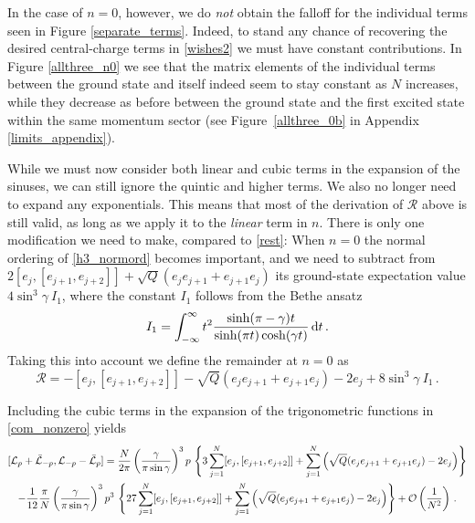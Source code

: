 \documentclass[a4paper,10pt]{article}
\newcommand{\hubert}[1]{$\framebox{\tiny h}$\ \textbf{\texttt{{\color{blue}\footnotesize#1}}}}
\newcommand{\KSgen}{\mathcal{L}}
\newcommand{\remainder}{\mathcal{R}}
\begin{document}
In the case of $n=0$, however, we do \emph{not} obtain the falloff for the individual terms seen in Figure \ref{separate_terms}. Indeed, to stand any chance of recovering the desired central-charge terms in \eqref{wishes2} we must have constant contributions. In Figure \ref{allthree_n0} we see that the matrix elements of the individual terms between the ground state and itself indeed seem to stay constant as $N$ increases, while they decrease as before between the ground state and the first excited state within the same momentum sector (see Figure~\ref{allthree_0b} in Appendix \ref{limits_appendix}).

While we must now consider both linear and cubic terms in the expansion of the sinuses, we can still ignore the quintic and higher terms. We also no longer need to expand any exponentials. This means that most of the derivation of $\remainder$ above is still valid, as long as we apply it to the  \emph{linear} term in $n$. There is only one modification we need to make, compared to \eqref{rest}: When $n=0$ the normal ordering of \eqref{h3_normord} becomes important, and we need to subtract from $2[e_j,[e_{j+1},e_{j+2}]] + \sqrt{Q}(e_je_{j+1} + e_{j+1}e_j)$ its ground-state expectation value $ 4\sin^3 \! \gamma \: I_1$, %
where  the constant $I_1$ follows from the Bethe ansatz \cite{KooSaleur}
%
\begin{equation} \label{I1-def}
I_1=\int_{-\infty}^\infty t^2 {\sinh(\pi-\gamma)t\over \sinh(\pi t)\cosh(\gamma t)} \, {\rm d}t \,.
\end{equation}
Taking this into account we define the remainder at $n=0$ as
\begin{equation}\label{rest_n0}
 \remainder = - [e_j,[e_{j+1},e_{j+2}]] 
 -   \sqrt{Q} (e_je_{j+1} + e_{j+1}e_j) -  2 e_{j} 
 + 8\sin^3 \! \gamma \: I_1 \,.
\end{equation}




Including the cubic terms in the expansion of the trigonometric functions in \eqref{com_nonzero} yields
\begin{multline}\label{com_n0}
[\KSgen_{p}+\bar{\KSgen}_{-p},\KSgen_{-p}-\bar{\KSgen}_{p}]  
=   \frac{N }{2\pi} \left( \frac{\gamma}{\pi \sin \gamma} \right)^3p~\Bigg\{ 3 \sum_{j=1}^{N} 
 [e_j,[e_{j+1},e_{j+2}]] 
 +  \sum_{j=1}^{N} 
 \Big( \sqrt{Q}(e_je_{j+1} + e_{j+1}e_j) - 2 e_{j} \Big)
\Bigg\}
%
%
\\
-  \frac{1}{12}\frac{\pi}{N}  \left( \frac{\gamma}{\pi \sin \gamma} \right)^3p^3~\Bigg\{27 \sum_{j=1}^{N} 
 [e_j,[e_{j+1},e_{j+2}]] 
 +  \sum_{j=1}^{N} 
 \Big( \sqrt{Q}(e_je_{j+1} + e_{j+1}e_j) - 2 e_{j} \Big)
\Bigg\} +\mathcal{O}\left({1\over N^{2}}\right) \,.
%
\end{multline}
%
\end{document}
